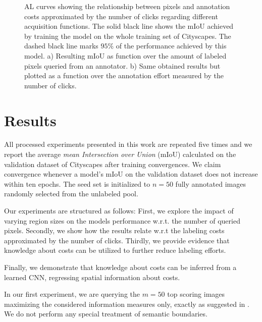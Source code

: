 \documentclass{bmvc2k}
\begin{document}
\label{sec:method}
\begin{figure}[!ht]
\begin{subfigure}[]{\texttt{[image: figures/results/pixels]}\label{fig:results:a}}\end{subfigure}
\begin{subfigure}[]{\texttt{[image: figures/results/clicks]}\label{fig:results:b}}\end{subfigure}
\caption{AL curves showing the relationship between pixels and annotation costs approximated by the number of clicks regarding different acquisition functions. The solid black line shows the mIoU achieved by training the model on the whole training set of Cityscapes. The dashed black line marks $95\%$ of the performance achieved by this model. a) Resulting mIoU as function over the amount of labeled pixels queried from an annotator. b) Same obtained results but plotted as a function over the annotation effort measured by the number of clicks. }
\end{figure}\section{Results}
All processed experiments presented in this work are repeated five times and we report the average \textit{mean Intersection over Union} (mIoU) calculated on the validation dataset of Cityscapes after training convergences. We claim convergence whenever a model's mIoU on the validation dataset does not increase within ten epochs.
The seed set is initialized to $n=50$ fully annotated images randomly selected from the unlabeled pool. 

Our experiments are structured as follows: First, we explore the impact of varying region sizes on the models performance w.r.t. the number of queried pixels. Secondly, we show how the results relate w.r.t the labeling costs approximated by the number of clicks. Thirdly, we provide evidence that knowledge about costs can be utilized to further reduce labeling efforts.



Finally, we demonstrate that knowledge about costs can be inferred from a learned CNN, regressing spatial information about costs. 

In our first experiment, we are querying the $m=50$ top scoring images maximizing the considered information measures only, exactly as suggested in \cite{DBLP:journals/corr/abs-1711-09168}. We do not perform any special treatment of semantic boundaries.
\end{document}
